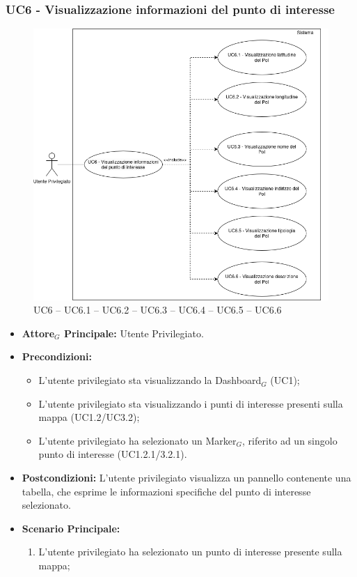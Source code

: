 \documentclass[10pt]{article}
\begin{document}
\begin{justify}
 \subsubsection{\textbf{UC6 - Visualizzazione informazioni del punto di interesse}}
\begin{figure}[H]
    \centering
    \includegraphics[width=0.7\linewidth]{UC6image.png}
    \caption{UC6 -- UC6.1 -- UC6.2 -- UC6.3 -- UC6.4 -- UC6.5 -- UC6.6}
    \label{fig:UC6}
\end{figure}
 \begin{itemize}
     \item \textbf{Attore$_G$ Principale:} Utente Privilegiato.
     \item \textbf{Precondizioni:}
       \begin{itemize}
    		\item L'utente privilegiato sta visualizzando la Dashboard$_G$ (UC1);
    	        \item L'utente privilegiato sta visualizzando i punti di interesse presenti sulla mappa (UC1.2/UC3.2);
    	        \item L'utente privilegiato ha selezionato un Marker$_G$, riferito ad un singolo punto di interesse (UC1.2.1/3.2.1).
       \end{itemize}
     \item \textbf{Postcondizioni:} L'utente privilegiato visualizza un pannello contenente una tabella, che esprime le informazioni specifiche del punto di interesse selezionato.
     \item \textbf{Scenario Principale:}
        \begin{enumerate}
          \item L'utente privilegiato ha selezionato un punto di interesse presente sulla mappa;

\end{enumerate}
\end{itemize}
\end{justify}
\end{document}
